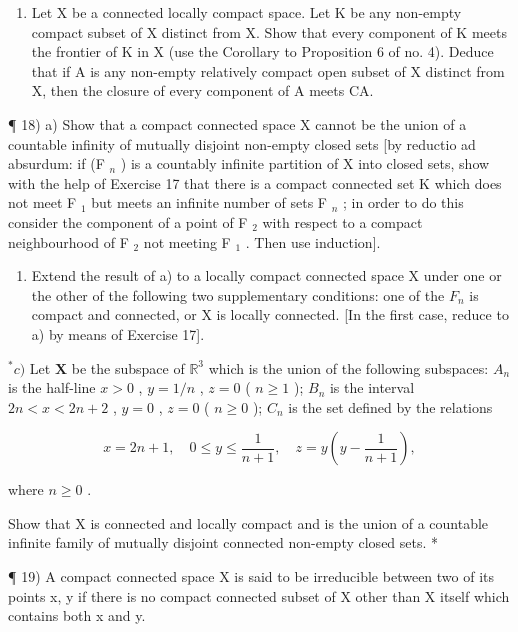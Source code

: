 \begin{enumerate}
\item
  Let X be a connected locally compact space. Let K be any non-empty compact subset of X distinct from X. Show that every component of K meets the frontier of K in X (use the Corollary to Proposition 6 of no. 4). Deduce that if A is any non-empty relatively compact open subset of X distinct from X, then the closure of every component of A meets CA.
\end{enumerate}

¶ 18) a) Show that a compact connected space X cannot be the union of a countable infinity of mutually disjoint non-empty closed sets {[}by reductio ad absurdum: if (F \(_{n}\) ) is a countably infinite partition of X into closed sets, show with the help of Exercise 17 that there is a compact connected set K which does not meet F \(_{1}\) but meets an infinite number of sets F \(_{n}\) ; in order to do this consider the component of a point of F \(_{2}\) with respect to a compact neighbourhood of F \(_{2}\) not meeting F \(_{1}\) . Then use induction{]}.

\begin{enumerate}
\def\labelenumi{\alph{enumi})}
\setcounter{enumi}{1}
\tightlist
\item
  Extend the result of a) to a locally compact connected space X under one or the other of the following two supplementary conditions: one of the \(F_{n}\) is compact and connected, or X is locally connected. {[}In the first case, reduce to a) by means of Exercise 17{]}.
\end{enumerate}

\(^{*}c)\) Let \(\mathbf{X}\) be the subspace of \(\mathbb{R}^3\) which is the union of the following subspaces: \(A_n\) is the half-line \(x > 0\) , \(y = 1/n\) , \(z = 0\) ( \(n \geqslant 1\) ); \(B_n\) is the interval \(2n < x < 2n + 2\) , \(y = 0\) , \(z = 0\) ( \(n \geqslant 0\) ); \(C_n\) is the set defined by the relations

\[
x = 2 n + 1, \quad 0 \leqslant y \leqslant \frac {1}{n + 1}, \quad z = y \left(y - \frac {1}{n + 1}\right),
\]

where \(n \geqslant 0\) .

Show that X is connected and locally compact and is the union of a countable infinite family of mutually disjoint connected non-empty closed sets. *

¶ 19) A compact connected space X is said to be irreducible between two of its points x, y if there is no compact connected subset of X other than X itself which contains both x and y.

